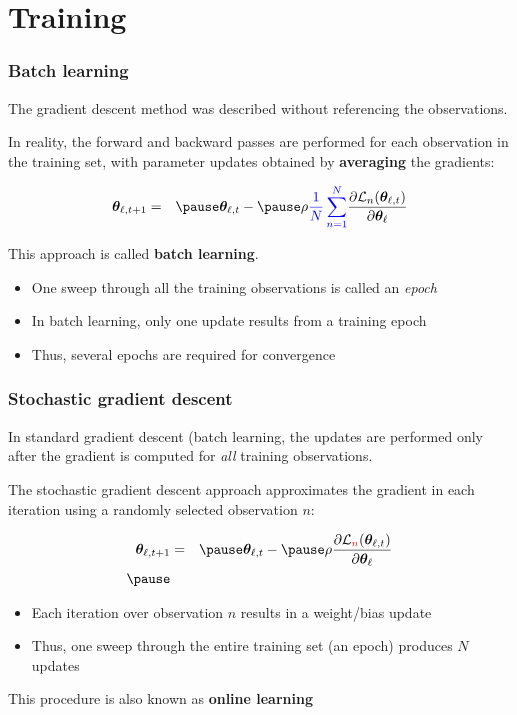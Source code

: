 \documentclass[smaller]{beamer}
\begin{document}
\section{Training}
\begin{frame}
  \frametitle{Batch learning}
  The gradient descent method was described without referencing the observations. \pause

  \medskip

  In reality, the forward and backward passes are performed for each observation in the training set, with parameter updates obtained by
  \textbf{\bl averaging} the gradients: \pause

  \begin{eqnarray}
    \bm\th_{\ell, t+1}  &=& \pause  \bm\th_{\ell,t} - \pause \rho{\bl  \fr1N \sum_{n=1}^N}\pd{\mc{L}_n(\bm \th_{\ell,t})}{\bm\th_{\ell}} 
   \end{eqnarray}

  \pause

  This approach is called \textbf{\bl batch learning}. \pause

  \begin{itemize}[<+->]
  \item One sweep through all the training observations is called an \textit{epoch}
  \item In batch learning, only one update results from a training epoch
  \item Thus, several epochs are required for convergence
  \end{itemize}
\end{frame}

\begin{frame}
  \frametitle{Stochastic gradient descent}
  \pause

  In standard gradient descent (batch learning, the updates are performed only after the gradient is computed for \textit{all} training observations.

  \pause

  \medskip
  
  The stochastic gradient descent approach approximates the gradient in each iteration using a {\rd randomly selected}  observation $n$: \pause

    \begin{eqnarray}
    \bm\th_{\ell, t+1}  &=& \pause  \bm\th_{\ell,t} - \pause \rho \pd{\mc{L}_{\rd n}(\bm \th_{\ell,t})}{\bm\th_{\ell}}  \\\pause
  \end{eqnarray}

  \pause

  \begin{itemize}[<+->]
  \item Each iteration over observation $n$ results in a weight/bias update
  \item Thus, one sweep through the entire training set (an epoch) produces $N$ updates
  \end{itemize}
  \pause
  This procedure is also known as \textbf{\rd online learning}
\end{frame}
\end{document}

